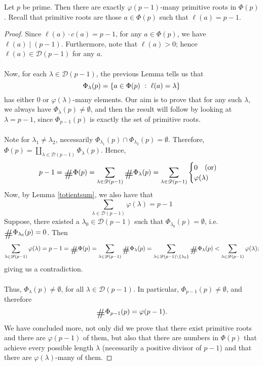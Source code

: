 \begin{theorem}[Gauss]\label{gaussprim}
Let $p$ be prime. Then there are exactly $\varphi(p-1)$-many primitive roots in $\Phi(p)$. Recall that primitive roots are those $a \in \Phi(p)$ such that $\ell(a) = p-1$.
\end{theorem}
\begin{proof}
Since $\ell(a)\cdot c(a) = p-1$, for any $a \in \Phi(p)$, we have $\ell(a) \mid (p-1)$. Furthermore, note that $\ell(a) > 0$; hence $\ell(a) \in \mathscr{D}(p-1)$ for any $a$.\\
\\
Now, for each $\lambda \in \mathscr{D}(p-1)$, the previous Lemma tells us that
\[\Phi_\lambda(p) = \left\{a \in \Phi(p)\ :\ \ell(a) = \lambda\right\}\]
has either $0$ or $\varphi(\lambda)$-many elements. Our aim is to prove that for any such $\lambda$, we always have $\Phi_\lambda(p) \neq \emptyset$, and then the result will follow by looking at $\lambda = p-1$, since $\Phi_{p-1}(p)$ is exactly the set of primitive roots.\\
\\
Note for $\lambda_1 \neq \lambda_2$, necessarily $\Phi_{\lambda_1}(p) \cap \Phi_{\lambda_2}(p) = \emptyset$. Therefore, $\displaystyle\Phi(p) = \coprod_{\lambda \in \mathscr{D}(p-1)}\Phi_{\lambda}(p)$. Hence,
\[p - 1 = \card\Phi(p) = \sum_{\lambda \in \mathscr{D}(p-1)}\card\Phi_\lambda(p) = \sum_{\lambda \in \mathscr{D}(p-1)}\begin{cases}0\quad\text{(or)}\\ \varphi(\lambda)\end{cases}\]
Now, by Lemma \ref{totientsum}, we also have that
\[\sum_{\lambda \in \mathscr{D}(p-1)}\varphi(\lambda) = p-1\]
Suppose, there existed a $\lambda_0 \in \mathscr{D}(p-1)$ such that $\Phi_{\lambda_0}(p) = \emptyset$, i.e. $\card\Phi_{\lambda_0}(p) = 0$. Then
\[\sum_{\lambda \in \mathscr{D}(p-1)}\varphi(\lambda) = p-1 = \card\Phi(p) = \sum_{\lambda \in \mathscr{D}(p-1)}\card\Phi_\lambda(p) = \sum_{\lambda \in \mathscr{D}(p-1) \setminus\set{\lambda_0}}\card\Phi_\lambda(p) < \sum_{\lambda \in \mathscr{D}(p-1)}\varphi(\lambda);\]
giving us a contradiction.\\
\\
Thus, $\Phi_\lambda(p) \neq \emptyset$, for all $\lambda \in \mathscr{D}(p-1)$. In particular, $\Phi_{p-1}(p) \neq \emptyset$, and therefore \[\card\Phi_{p-1}(p) = \varphi(p-1).\]
We have concluded more, not only did we prove that there exist primitive roots and there are $\varphi(p-1)$ of them, but also that there are numbers in $\Phi(p)$ that achieve every possible length $\lambda$ (necessarily a positive divisor of $p-1$) and that there are $\varphi(\lambda)$-many of them.
\end{proof}


